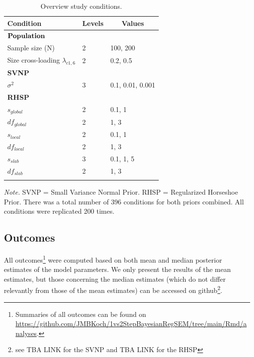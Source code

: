\documentclass[
  man, donotrepeattitle,floatsintext]{apa6}
\begin{document}
\begin{table}[tbp]

\begin{center}
\begin{threeparttable}

\caption{\label{tab:unnamed-chunk-2}Overview study conditions.}

\begin{tabular}{lll}
\toprule
Condition & \multicolumn{1}{c}{Levels} & \multicolumn{1}{c}{Values}\\
\midrule
$\bf{Population}$ &  & \\
Sample size (N) & 2 & 100, 200\\
Size cross-loading $\lambda_{c1 , 6}$ & 2 & 0.2, 0.5\\
\bf{SVNP} &  & \\
$\sigma^2$ & 3 & 0.1, 0.01, 0.001\\
\bf{RHSP} &  & \\
$s_{global}$ & 2 & 0.1, 1\\
$df_{global}$ & 2 & 1, 3\\
$s_{local}$ & 2 & 0.1, 1\\
$df_{local}$ & 2 & 1, 3\\
$s_{slab}$ & 3 & 0.1, 1, 5\\
$df_{slab}$ & 2 & 1, 3\\
\bottomrule
\addlinespace
\end{tabular}

\begin{tablenotes}[para]
\normalsize{\textit{Note.} SVNP = Small Variance Normal Prior. RHSP = Regularized Horseshoe Prior. There was a total number of 396 conditions for both priors combined.  All conditions were replicated 200 times.}
\end{tablenotes}

\end{threeparttable}
\end{center}

\end{table}

\hypertarget{outcomes}{%
\subsection{Outcomes}\label{outcomes}}

All outcomes\footnote{Summaries of all outcomes can be found on \url{https://github.com/JMBKoch/1vs2StepBayesianRegSEM/tree/main/Rmd/analyses}.} were computed based on both mean and median posterior estimates of the model parameters. We only present the results of the mean estimates, but those concerning the median estimates (which do not differ relevantly from those of the mean estimates) can be accessed on github\footnote{see TBA LINK for the SVNP and TBA LINK for the RHSP}.
\end{document}
